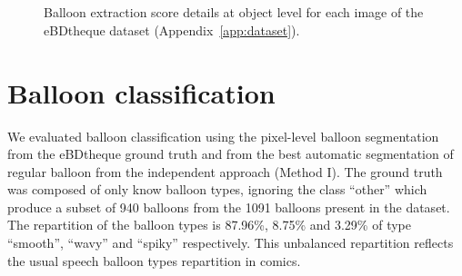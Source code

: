 \begin{figure}[!ht]
  \\
  \\

  \caption[Balloon extraction score details at object level for each image of the eBDtheque dataset]{Balloon extraction score details at object level for each image of the eBDtheque dataset (Appendix~\ref{app:dataset}).}
    \label{fig:ex:balloon_detection_result_details}
\end{figure}



\section{Balloon classification} %
\label{sub:ex:balloon_classification}
We evaluated balloon classification using the pixel-level balloon segmentation from the eBDtheque ground truth and from the best automatic segmentation of regular balloon from the independent approach (Method I).
The ground truth was composed of only know balloon types, ignoring the class ``other'' which produce a subset of 940 balloons from the 1091 balloons present in the dataset.
The repartition of the balloon types is 87.96\%, 8.75\% and 3.29\% of type ``smooth'', ``wavy'' and ``spiky'' respectively.
This unbalanced repartition reflects the usual speech balloon types repartition in comics.

